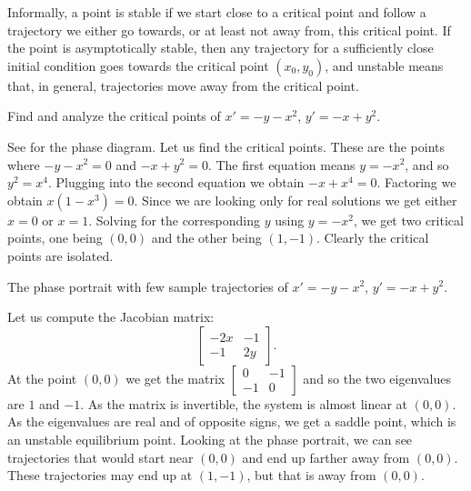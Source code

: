 \documentclass{ximera}
\begin{document}
Informally, a point is stable if we start close to a critical point and follow a trajectory we either go towards, or at least not away from, this critical point. If the point is asymptotically stable, then any trajectory for a sufficiently close initial condition goes towards the critical point $(x_0,y_0)$, and unstable means that, in general, trajectories move away from the critical point. 

\begin{example} \label{example:nlin-xplusy}
    Find and analyze the critical points of $x'=-y-x^2$, $y'=-x+y^2$.
\end{example}

\begin{exampleSol}
    See  for the phase diagram. Let us find the critical points.  These are the points where $-y-x^2 = 0$ and $-x+y^2=0$.  The first equation means $y = -x^2$, and so $y^2 = x^4$.  Plugging into the second equation we obtain $-x+x^4 = 0$.  Factoring we obtain $x(1-x^3)=0$.  Since we are looking only for real solutions we get either $x=0$ or $x=1$.  Solving for the corresponding $y$ using $y = -x^2$, we get two critical points, one being $(0,0)$ and the other being $(1,-1)$.  Clearly the critical points are isolated.
    
    \begin{myfig}
        \capstart
        \caption{The phase portrait with few sample trajectories of $x'=-y-x^2$, $y'=-x+y^2$.  \label{fig:nlin-ex813-new}}
    \end{myfig}
    
    
    Let us compute the Jacobian matrix:
    \begin{equation*}
        \begin{bmatrix}
            -2x & -1 \\
            -1 & 2y
        \end{bmatrix} .
    \end{equation*}
    At the point $(0,0)$ we get the matrix 
    $\left[ \begin{smallmatrix} 0 & -1 \\ -1 & 0 \end{smallmatrix} \right]$ 
    and so the two eigenvalues are $1$ and $-1$.  As the matrix is invertible, the system is almost linear at $(0,0)$.  As the eigenvalues are real and of opposite signs, we get a saddle point, which is an unstable equilibrium point. Looking at the phase portrait, we can see trajectories that would start near $(0,0)$ and end up farther away from $(0,0)$. These trajectories may end up at $(1,-1)$, but that is away from $(0,0)$. 
    

\end{exampleSol}
\end{document}
